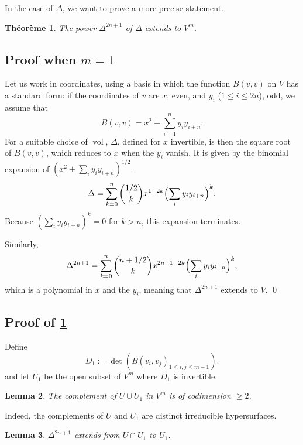 \documentclass[11pt,a4paper]{article}
\theoremstyle{plain}
\newtheorem{theorem}{Th\'eor\`eme}
\newtheorem{lemma}[theorem]{Lemma}
\theoremstyle{definition}
\DeclareMathOperator{\vol}{vol}
\begin{document}
In the case of $\Delta$, we want to prove a more precise statement.

\begin{theorem}\label{thm:5.4}
The power $\Delta^{2n+1}$ of $\Delta$ extends to $V^m$.
\end{theorem}

\subsection{Proof when $m = 1$}
Let us work in coordinates, using a basis in which the function $B(v,v)$ on $V$ has a standard form: if the coordinates of $v$ are $x$, even, and $y_i$ ($1 \leq i \leq 2n$), odd, we assume that
\begin{equation}\label{eq:5.4.1}
B(v,v) = x^2 + \sum_{i=1}^{n} y_i y_{i+n}.
\end{equation}
For a suitable choice of $\vol$, $\Delta$, defined for $x$ invertible, is then the square root of $B(v,v)$, which reduces to $x$ when the $y_i$ vanish. It is given by the binomial expansion of $(x^2 + \sum_i y_i y_{i+n})^{1/2}$:
\begin{equation}\label{eq:5.4.2}
\Delta = \sum_{k=0}^{n} \binom{1/2}{k} x^{1-2k} \Bigl(\sum_i y_i y_{i+n}\Bigr)^k.
\end{equation}
Because $(\sum_i y_i y_{i+n})^k = 0$ for $k > n$, this expansion terminates.

Similarly,
\begin{equation}\label{eq:5.4.3}
\Delta^{2n+1} = \sum_{k=0}^{n} \binom{n+1/2}{k} x^{2n+1-2k} \Bigl(\sum_i y_i y_{i+n}\Bigr)^k,
\end{equation}
which is a polynomial in $x$ and the $y_i$, meaning that $\Delta^{2n+1}$ extends to $V$.
\qed

\subsection{Proof of \ref{thm:5.4}}
Define
\[
D_1 := \det(B(v_i, v_j)_{1 \leq i,j \leq m-1}).
\]
and let $U_1$ be the open subset of $V^m$ where $D_1$ is invertible.

\begin{lemma}\label{lem:5.6}
The complement of $U \cup U_1$ in $V^m$ is of codimension $\geq 2$.
\end{lemma}

Indeed, the complements of $U$ and $U_1$ are distinct irreducible hypersurfaces.

\begin{lemma}\label{lem:5.7}
$\Delta^{2n+1}$ extends from $U \cap U_1$ to $U_1$.
\end{lemma}
\end{document}
